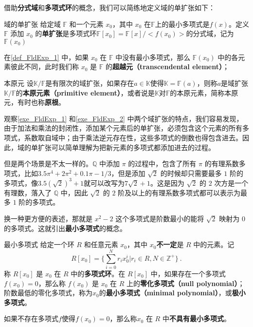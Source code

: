 借助\textbf{分式域}和\textbf{多项式环}的概念，我们可以简练地定义域的单扩张如下：


\begin{definition}{域的单扩张}\label{def_FldExp_1}
给定域 $\mathbb{F}$ 和一个元素 $x_0$，其中 $x_0$ 在$\mathbb{F}$上的最小多项式是$f(x)$。定义 $\mathbb{F}$ 添加 $x_0$ 的\textbf{单扩张}是多项式环$\mathbb{F}[x_0]=\mathbb{F}[x]/<f(x_0)>$的分式域，记为$\mathbb{F}(x_0)$
\end{definition}

在\autoref{def_FldExp_1} 中，如果 $x_0$ 在 $\mathbb{F}$ 中没有最小多项式，那么 $\mathbb{F}(x_0)$ 中的各元素彼此不同，此时我们称 $x_0$ 是 $\mathbb{F}$ 的\textbf{超越元（transcendental element）}；

\begin{definition}{本原元}\label{def_FldExp_7}
设$\mathbb{K}/\mathbb{F}$是有限次的域扩张，如果存在$a\in\mathbb{K}$使得$\mathbb{K}=\mathbb{F}(a)$，则称$a$是域扩张$\mathbb{K}/\mathbb{F}$的\textbf{本原元素（primitive element）}，或者说是$\mathbb{K}$对$\mathbb{F}$的本原元素，简称本原元，有时也称\textbf{原根}。
\end{definition}

观察\autoref{exe_FldExp_1} 和\autoref{exe_FldExp_2} 中两个域扩张的特点，我们容易发现，由于加法和乘法的封闭性，添加某个元素后的单扩张，必须包含这个元素的所有多项式，系数取自域中；由于乘法逆元存在性，这些多项式的倒数也得包含进去。因此，域的单扩张可以简单理解为把新元素的多项式都添加进去的过程。

但是两个场景是不太一样的。$\mathbb{Q}$ 中添加 $\pi$ 的过程中，包含了所有 $\pi$ 的有理系数多项式，比如$3.5\pi^4+2\pi^2+0.1\pi-1/3$，但是添加 $\sqrt{2}$ 的时候却只需要最多 $1$ 阶的多项式，像$3.5(\sqrt{2})^3+1$就可以改写为$7\sqrt{2}+1$。这是因为 $\sqrt{2}$ 的 $2$ 次方是一个有理数，落入了 $\mathbb{Q}$ 中，因此 $\sqrt{2}$ 的 $2$ 阶及以上的有理系数多项式都可以表示为最多 $1$ 阶的多项式。

换一种更方便的表述，那就是 $x^2-2$ 这个多项式是阶数最小的能将 $\sqrt{2}$ 映射为 $0$ 的多项式。这就引出\textbf{最小多项式}的概念。

\begin{definition}{最小多项式}
给定一个环 $R$ 和任意元素 $x_0$，其中 $x_0$\textbf{不一定}是 $R$ 中的元素。记
$$R[x_0]=\{\sum_{i=0}^N r_ix_0^i|r_i\in R, N\in\mathbb{Z}^+\}~.$$称 $R[x_0]$ 是 $x_0$ 在 $R$ 中的\textbf{多项式环}。在 $R[x_0]$ 中，如果存在一个多项式 $f(x_0)=0$，那么称 $f(x_0)$ 是 $x_0$ 在 $R$ 上的\textbf{零化多项式（null polynomial）}；阶数最低的零化多项式，称为$x_0$的\textbf{最小多项式（minimal polynomial）}，或\textbf{极小多项式}。

如果不存在多项式$f$使得$f(x_0)=0$，那么称$x_0$ 在 $R$ 中\textbf{不具有最小多项式}。
\end{definition}

